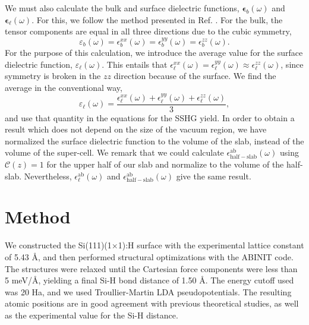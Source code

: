 \documentclass[prb,superscriptaddress,showpacs,twocolumn,letterpaper]{revtex4}
\begin{document}
We must also calculate the bulk and surface dielectric functions,
$\boldsymbol{\epsilon}_b(\omega)$ and $\boldsymbol{\epsilon}_\ell(\omega)$. For
this, we follow the method presented in Ref. . For the
bulk, the tensor components are equal in all three directions due to the cubic
symmetry,
\begin{equation*}
\varepsilon_{b}(\omega) = 
\epsilon^{xx}_{b}(\omega) = 
\epsilon^{yy}_{b}(\omega) = 
\epsilon^{zz}_{b}(\omega).
\end{equation*}
For the purpose of this calculation, we introduce the average value for the
surface dielectric function, $\varepsilon_\ell(\omega)$. This entails that
$\epsilon^{xx}_{\ell}(\omega) = \epsilon^{yy}_{\ell}(\omega) \approx
\epsilon^{zz}_{\ell}(\omega)$, since symmetry is broken in the $zz$ direction
because of the surface. We find the average in the conventional way,
\begin{equation*}
\varepsilon_{\ell}(\omega) = 
\frac{\epsilon^{xx}_{\ell}(\omega) + 
\epsilon^{yy}_{\ell}(\omega) + 
\epsilon^{zz}_{\ell}(\omega)}{3},
\end{equation*}
and use that quantity in the equations for the SSHG yield. In order to obtain a
result which does not depend on the size of the vacuum
region,\cite{nicolasPRB15} we have normalized the surface dielectric function to
the volume of the slab, instead of the volume of the super-cell. We remark that
we could calculate $\epsilon^{\mathrm{ab}}_{\mathrm{half-slab}}(\omega)$ using
${\mathcal{C}}(z)=1$ for the upper half of our slab and normalize to the volume
of the half-slab. Nevertheless, $\epsilon^{\mathrm{ab}}_{\ell}(\omega)$ and
$\epsilon^{\mathrm{ab}}_{\mathrm{half-slab}}(\omega)$ give the same
result.\cite{hoganPRB03, castilloPRB03, nicolasPRB15}


\section{Method}\label{sec:method}

We constructed the Si(111)(1$\times$1):H surface with the experimental lattice
constant of 5.43 \AA, and then performed structural optimizations with the
ABINIT\cite{gonzeCPS09, abinit} code. The structures were relaxed until the
Cartesian force components were less than 5 meV/\AA, yielding a final Si-H bond
distance of 1.50 \AA. The energy cutoff used was 20 Ha, and we used
Troullier-Martin LDA pseudopotentials.\cite{troullierPRB91} The resulting atomic
positions are in good agreement with previous theoretical studies,
\cite{kaxirasPRB88, jonaPRB95, alfonsoPRB96, cargnoniJOCP00, mejiaPRB02} as well
as the experimental value for the Si-H distance.\cite{weastCRC88}
\end{document}

